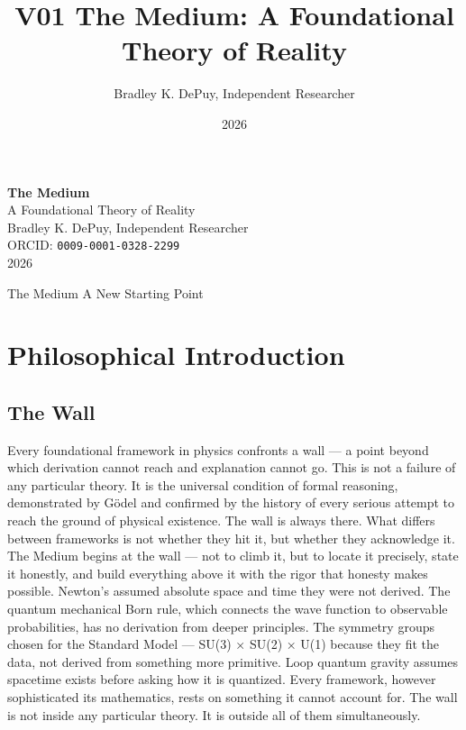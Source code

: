\documentclass[11pt,letterpaper]{article}
\author{Bradley K. DePuy, Independent Researcher}
\date{2026}
\title{V01 The Medium: A Foundational Theory of Reality}
\begin{document}
\pagestyle{plain}
\begin{titlepage}
\vspace*{4cm}
\begin{center}
  {\LARGE\bfseries The Medium}\\[0.6em]
  {\large A Foundational Theory of Reality}\\[2.5em]
  {\normalsize Bradley K. DePuy, Independent Researcher}\\[0.5em]
  {\normalsize ORCID: \mbox{\texttt{0009-0001-0328-2299}}}\\[0.5em]
  {\normalsize 2026}
\end{center}
\end{titlepage}

\pagestyle{body}

The Medium
A New Starting Point
\section{Philosophical Introduction}
\label{sec:orgd50da21}
\subsection{The Wall}
\label{sec:org96496cc}
Every foundational framework in physics confronts a wall — a point beyond which derivation cannot reach and explanation cannot go. This is not a failure of any particular theory. It is the universal condition of formal reasoning, demonstrated by Gödel and confirmed by the history of every serious attempt to reach the ground of physical existence. The wall is always there. What differs between frameworks is not whether they hit it, but whether they acknowledge it. The Medium begins at the wall — not to climb it, but to locate it precisely, state it honestly, and build everything above it with the rigor that honesty makes possible.
Newton's assumed absolute space and time they were not derived. The quantum mechanical Born rule, which connects the wave function to observable probabilities, has no derivation from deeper principles. The symmetry groups chosen for the Standard Model — SU(3) × SU(2) × U(1) because they fit the data, not derived from something more primitive. Loop quantum gravity assumes spacetime exists before asking how it is quantized. Every framework, however sophisticated its mathematics, rests on something it cannot account for. The wall is not inside any particular theory. It is outside all of them simultaneously.
\end{document}
